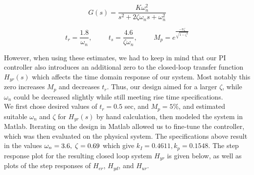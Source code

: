 \documentclass[11pt,titlepage]{article}
\begin{document}
	    \begin{equation}
	    	G(s)=\frac{K\omega_n^2}{s^2+2\zeta \omega_ns+\omega_{n}^2}
	    \end{equation}
	    
	    \begin{equation}
	    	t_r = \frac{1.8}{\omega_n}, \hspace{1cm} t_s=\frac{4.6}{\zeta\omega_n},  \hspace{1cm}  M_p=e^{\frac{-\pi \zeta}{\sqrt{1-\zeta^2}}}
	    \end{equation}
    
    	\noindent However, when using these estimates, we had to keep in mind that our PI controller also introduces an additional zero to the closed-loop transfer function $H_{yr}(s)$ which affects the time domain response of our system. Most notably this zero increases $M_p$ and decreases $t_r$. Thus, our design aimed for a larger $\zeta$, while $\omega_n$ could be decreased slightly while still meeting rise time specifications.\\
    
    	\noindent We first chose desired values of $t_r=0.5$ sec, and $M_p=5\%$, and estimated suitable $\omega_n$ and $\zeta$ for $H_{yr}(s)$ by hand calculation, then modeled the system in Matlab. Iterating on the design in Matlab allowed us to fine-tune the controller, which was then evaluated on the physical system. The specifications above result in the values $\omega_n=3.6, \hspace{0.1cm} \zeta=0.69 $ which give $k_I=0.4611 , k_p=0.1548$. The step response plot for the resulting closed loop system $H_{yr}$ is given below, as well as plots of the step responses of $H_{er}$, $H_{yd}$, and $H_{ur}$.
	
\end{document}
